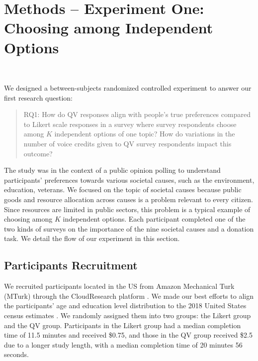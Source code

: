\section{Methods -- Experiment One: Choosing among Independent Options}~\label{method_exp1}

We designed a between-subjects randomized controlled experiment to answer our first research question: \begin{quote} RQ1: How do QV responses align with people's true preferences compared to Likert scale responses in a survey where survey respondents choose among $K$ independent options of one topic? How do variations in the number of voice credits given to QV survey respondents impact this outcome? \end{quote} The study was in the context of a public opinion polling to understand participants' preferences towards various societal causes, such as the environment, education, veterans. We focused on the topic of societal causes because public goods and resource allocation across causes is a problem relevant to every citizen. Since resources are limited in public sectors, this problem is a typical example of choosing among $K$ independent options. Each participant completed one of the two kinds of surveys on the importance of the nine societal causes and a donation task. We detail the flow of our experiment in this section.

\subsection{Participants Recruitment}
We recruited participants located in the US from Amazon Mechanical Turk (MTurk) through the CloudResearch platform \cite{litman2017turkprime}. We made our best efforts to align the participants' age and education level distribution to the 2018 United States census estimates \cite{census2018}. We randomly assigned them into two groups: the Likert group and the QV group. Participants in the Likert group had a median completion time of 11.5 minutes and received \$0.75, and those in the QV group received \$2.5 due to a longer study length, with a median completion time of 20 minutes 56 seconds.


